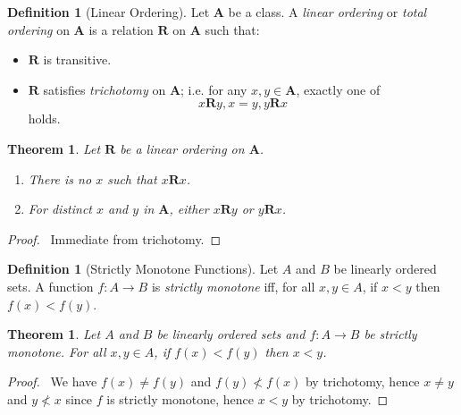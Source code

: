 \documentclass{report}
\let\qed\relax
\newtheorem{theorem}[axiom]{Theorem}
\theoremstyle{definition}
\newtheorem{definition}[axiom]{Definition}
\begin{document}
    \begin{definition}[Linear Ordering]
        Let $\mathbf{A}$ be a class. A \emph{linear ordering} or \emph{total ordering} on $\mathbf{A}$
        is a relation $\mathbf{R}$ on $\mathbf{A}$ such that:
        \begin{itemize}
            \item $\mathbf{R}$ is transitive.
            \item $\mathbf{R}$ satisfies \emph{trichotomy} on $\mathbf{A}$; i.e. for any $x, y \in \mathbf{A}$,
            exactly one of
            \[ x\mathbf{R}y, x=y, y\mathbf{R}x \]
            holds.
        \end{itemize}
    \end{definition}

    \begin{theorem}
        Let $\mathbf{R}$ be a linear ordering on $\mathbf{A}$.
        \begin{enumerate}
            \item There is no $x$ such that $x \mathbf{R} x$.
            \item For distinct $x$ and $y$ in $\mathbf{A}$, either $x\mathbf{R}y$ or $y\mathbf{R}x$.
        \end{enumerate}
    \end{theorem}

    \begin{proof}
        \pf\ Immediate from trichotomy. \qed
    \end{proof}

    \begin{definition}[Strictly Monotone Functions]
        Let $A$ and $B$ be linearly ordered sets. A function $f : A \rightarrow B$ is \emph{strictly
        monotone} iff, for all $x, y \in A$, if $x < y$ then $f(x) < f(y)$.
    \end{definition}

    \begin{theorem}
        Let $A$ and $B$ be linearly ordered sets and $f : A \rightarrow B$ be strictly monotone.
        For all $x, y \in A$, if $f(x) < f(y)$ then $x < y$.
    \end{theorem}

    \begin{proof}
        \pf\ We have $f(x) \neq f(y)$ and $f(y) \not < f(x)$ by trichotomy, hence $x \neq y$ and $y \not < x$
        since $f$ is strictly monotone, hence $x < y$ by trichotomy. \qed
    \end{proof}
\end{document}
